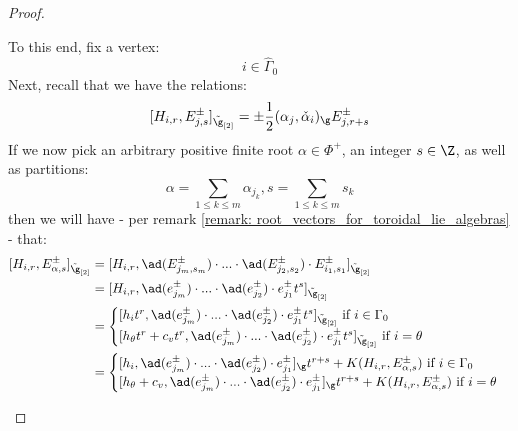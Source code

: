 \begin{proof}
\begin{itemize}
                    To this end, fix a vertex:
                        $$i \in \hat{\Gamma}_0$$
                    Next, recall that we have the relations:
                        $$[H_{i, r}, E_{j, s}^{\pm}]_{\tilde{\g}_{[2]}} = \pm \frac12 (\alpha_j, \check{\alpha}_i)_{\g} E_{j, r + s}^{\pm}$$
                    If we now pick an arbitrary positive finite root $\alpha \in \Phi^+$, an integer $s \in \Z$, as well as partitions: 
                        $$\alpha = \sum_{1 \leq k \leq m} \alpha_{j_k}, s = \sum_{1 \leq k \leq m} s_k$$
                    then we will have - per remark \ref{remark: root_vectors_for_toroidal_lie_algebras} - that:
                        $$
                            \begin{aligned}
                                [H_{i, r}, E_{\alpha, s}^{\pm}]_{\tilde{\g}_{[2]}} & = [ H_{i, r}, \ad(E_{j_m, s_m}^{\pm}) \cdot ... \cdot \ad(E_{j_2, s_2}^{\pm}) \cdot E_{i_1, s_1}^{\pm} ]_{\tilde{\g}_{[2]}}
                                \\
                                & = [ H_{i, r}, \ad(e_{j_m}^{\pm}) \cdot ... \cdot \ad(e_{j_2}^{\pm}) \cdot e_{j_1}^{\pm} t^s ]_{\tilde{\g}_{[2]}}
                                \\
                                & = 
                                \begin{cases}
                                    \text{$[ h_i t^r, \ad(e_{j_m}^{\pm}) \cdot ... \cdot \ad(e_{j_2}^{\pm}) \cdot e_{j_1}^{\pm} t^s ]_{\tilde{\g}_{[2]}}$ if $i \in \Gamma_0$}
                                    \\
                                    \text{$[ h_{\theta} t^r + c_v t^r, \ad(e_{j_m}^{\pm}) \cdot ... \cdot \ad(e_{j_2}^{\pm}) \cdot e_{j_1}^{\pm} t^s ]_{\tilde{\g}_{[2]}}$ if $i = \theta$}
                                \end{cases}
                                \\
                                & = 
                                \begin{cases}
                                    \text{$[ h_i, \ad(e_{j_m}^{\pm}) \cdot ... \cdot \ad(e_{j_2}^{\pm}) \cdot e_{j_1}^{\pm} ]_{\g} t^{r + s} + K(H_{i, r}, E_{\alpha, s}^{\pm})$ if $i \in \Gamma_0$}
                                    \\
                                    \text{$[ h_{\theta} + c_v, \ad(e_{j_m}^{\pm}) \cdot ... \cdot \ad(e_{j_2}^{\pm}) \cdot e_{j_1}^{\pm} ]_{\g} t^{r + s} + K(H_{i, r}, E_{\alpha, s}^{\pm})$ if $i = \theta$}

\end{cases}
\end{aligned}$$
\end{itemize}
\end{proof}
